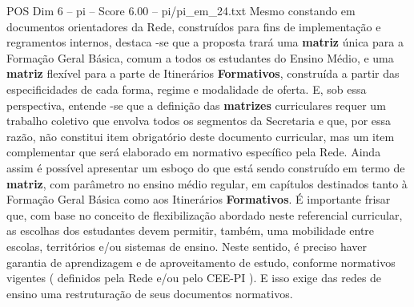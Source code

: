 \begin{textsample}{POS Dim 6 – pi – Score 6.00 – pi/pi\_em\_24.txt}
Mesmo constando em documentos orientadores da Rede, construídos para fins de implementação e regramentos internos, destaca -se que a proposta trará uma \textbf{matriz} única para a Formação Geral Básica, comum a todos os estudantes do Ensino Médio, e uma \textbf{matriz} flexível para a parte de Itinerários \textbf{Formativos}, construída a partir das especificidades de cada forma, regime e modalidade de oferta.
E, sob essa perspectiva, entende -se que a definição das \textbf{matrizes} curriculares requer um trabalho coletivo que envolva todos os segmentos da Secretaria e que, por essa razão, não constitui item obrigatório deste documento curricular, mas um item complementar que será elaborado em normativo específico pela Rede.
Ainda assim é possível apresentar um esboço do que está sendo construído em termo de \textbf{matriz}, com parâmetro no ensino médio regular, em capítulos destinados tanto à Formação Geral Básica como aos Itinerários \textbf{Formativos}.
É importante frisar que, com base no conceito de flexibilização abordado neste referencial curricular, as escolhas dos estudantes devem permitir, também, uma mobilidade entre escolas, territórios e/ou sistemas de ensino.
Neste sentido, é preciso haver garantia de aprendizagem e de aproveitamento de estudo, conforme normativos vigentes ( definidos pela Rede e/ou pelo CEE-PI ).
E isso exige das redes de ensino uma restruturação de seus documentos normativos.

\end{textsample}
